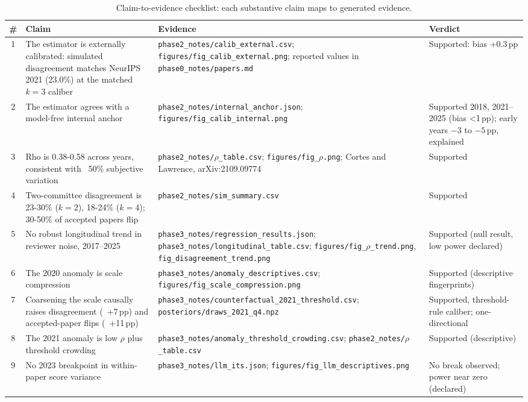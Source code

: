 \documentclass[10pt]{article}
\begin{document}
\begin{table}[t]
\centering
\small
\caption{Claim-to-evidence checklist: each substantive claim maps to generated evidence.}\label{tab:claims}
\begin{tabular}{c p{5.2cm} p{5.2cm} p{3.2cm}}\toprule
\# & Claim & Evidence & Verdict \\
\midrule
1 & The estimator is externally calibrated: simulated disagreement matches NeurIPS 2021 (23.0\%) at the matched $k=3$ caliber & \texttt{phase2\_notes/calib\_external.csv}; \texttt{figures/fig\_calib\_external.png}; reported values in \texttt{phase0\_notes/papers.md} & Supported: bias +0.3\,pp \\
2 & The estimator agrees with a model-free internal anchor & \texttt{phase2\_notes/internal\_anchor.json}; \texttt{figures/fig\_calib\_internal.png} & Supported 2018, 2021--2025 (bias <1\,pp); early years $-3$ to $-5$\,pp, explained \\
3 & Rho is 0.38-0.58 across years, consistent with ~50\% subjective variation & \texttt{phase2\_notes/$\rho$\_table.csv}; \texttt{figures/fig\_$\rho$.png}; Cortes and Lawrence, arXiv:2109.09774 & Supported \\
4 & Two-committee disagreement is 23-30\% ($k=2$), 18-24\% ($k=4$); 30-50\% of accepted papers flip & \texttt{phase2\_notes/sim\_summary.csv} & Supported \\
5 & No robust longitudinal trend in reviewer noise, 2017--2025 & \texttt{phase3\_notes/regression\_results.json}; \texttt{phase3\_notes/longitudinal\_table.csv}; \texttt{figures/fig\_$\rho$\_trend.png}, \texttt{fig\_disagreement\_trend.png} & Supported (null result, low power declared) \\
6 & The 2020 anomaly is scale compression & \texttt{phase3\_notes/anomaly\_descriptives.csv}; \texttt{figures/fig\_scale\_compression.png} & Supported (descriptive fingerprints) \\
7 & Coarsening the scale causally raises disagreement (~+7\,pp) and accepted-paper flips (~+11\,pp) & \texttt{phase3\_notes/counterfactual\_2021\_threshold.csv}; \texttt{posteriors/draws\_2021\_q4.npz} & Supported, threshold-rule caliber; one-directional \\
8 & The 2021 anomaly is low $\rho$ plus threshold crowding & \texttt{phase3\_notes/anomaly\_threshold\_crowding.csv}; \texttt{phase2\_notes/$\rho$\_table.csv} & Supported (descriptive) \\
9 & No 2023 breakpoint in within-paper score variance & \texttt{phase3\_notes/llm\_its.json}; \texttt{figures/fig\_llm\_descriptives.png} & No break observed; power near zero (declared) \\

\end{tabular}
\end{table}
\end{document}
